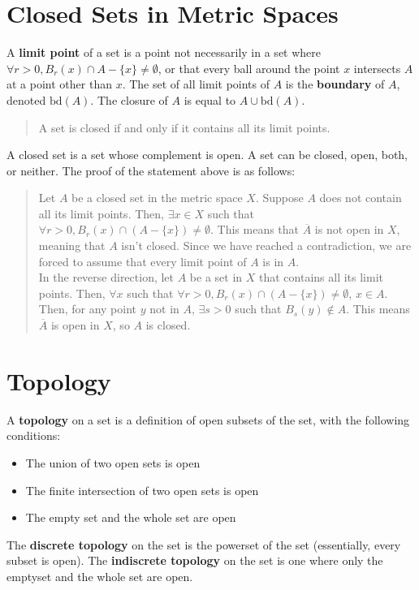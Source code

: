 \documentclass[12pt]{extarticle}
\newcommand{\plain}[1]{\textrm{#1}}
\begin{document}
\section*{Closed Sets in Metric Spaces}%
A \textbf{limit point} of a set is a point not necessarily in a set where $\forall r>0, B_{r}(x)\cap A-\{x\} \neq \emptyset$, or that every ball around the point $x$ intersects $A$ at a point other than $x$. The set of all limit points of $A$ is the \textbf{boundary} of $A$, denoted $\plain{bd}(A)$. The closure of $A$ is equal to $A\cup \plain{bd}(A)$.
  \begin{quote}
    A set is closed if and only if it contains all its limit points.
  \end{quote}
A closed set is a set whose complement is open. A set can be closed, open, both, or neither. The proof of the statement above is as follows:
  \begin{quote}
    Let $A$ be a closed set in the metric space $X$. Suppose $A$ does not contain all its limit points. Then, $\exists x\in X$ such that $\forall r>0, B_{r}(x)\cap (A-\{x\}) \neq \emptyset$. This means that $\overline{A}$ is not open in $X$, meaning that $A$ isn't closed. Since we have reached a contradiction, we are forced to assume that every limit point of $A$ is in $A$.\\
    In the reverse direction, let $A$ be a set in $X$ that contains all its limit points. Then, $\forall x$ such that $\forall r>0, B_{r}(x)\cap (A-\{x\})\neq \emptyset$, $x\in A$. Then, for any point $y$ not in $A$, $\exists s>0$ such that $B_{s}(y)\not\in A$. This means $\overline{A}$ is open in $X$, so $A$ is closed.
  \end{quote}
 \section*{Topology}%
 A \textbf{topology} on a set is a definition of open subsets of the set, with the following conditions:
   \begin{itemize}
     \item The union of two open sets is open
     \item The finite intersection of two open sets is open
     \item The empty set and the whole set are open
   \end{itemize}
The \textbf{discrete topology} on the set is the powerset of the set (essentially, every subset is open). The \textbf{indiscrete topology} on the set is one where only the emptyset and the whole set are open.
\end{document}
